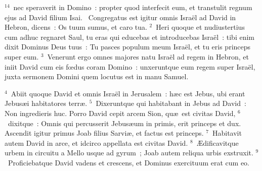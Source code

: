 ${}^{14}$~nec speraverit in Domino~: propter quod interfecit eum, et transtulit regnum ejus ad David filium Isai.
~\lettrine[lines=10,image=true,loversize=0.05,lraise=-0.03]{C}{}ongregatus est igitur omnis Isra\"el ad David in Hebron, dicens~: Os tuum sumus, et caro tua.
${}^{2}$~Heri quoque et nudiustertius cum adhuc regnaret Saul, tu eras qui educebas et introducebas Isra\"el~: tibi enim dixit Dominus Deus tuus~: Tu pasces populum meum Isra\"el, et tu eris princeps super eum.
${}^{3}$~Venerunt ergo omnes majores natu Isra\"el ad regem in Hebron, et iniit David cum eis fœdus coram Domino~: unxeruntque eum regem super Isra\"el, juxta sermonem Domini quem locutus est in manu Samuel.


${}^{4}$~Abiit quoque David et omnis Isra\"el in Jerusalem~: h\ae c est Jebus, ubi erant Jebus\ae i habitatores terr\ae .
${}^{5}$~Dixeruntque qui habitabant in Jebus ad David~: Non ingredieris huc. Porro David cepit arcem Sion, qu\ae\ est civitas David,
${}^{6}$~dixitque~: Omnis qui percusserit Jebus\ae um in primis, erit princeps et dux. Ascendit igitur primus Joab filius Sarvi\ae , et factus est princeps.
${}^{7}$~Habitavit autem David in arce, et idcirco appellata est civitas David.
${}^{8}$~\AE dificavitque urbem in circuitu a Mello usque ad gyrum~; Joab autem reliqua urbis exstruxit.
${}^{9}$~Proficiebatque David vadens et crescens, et Dominus exercituum erat cum eo.


